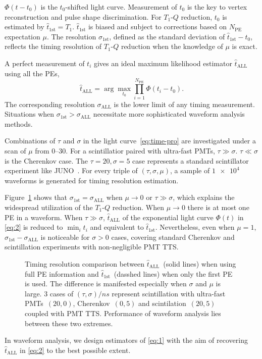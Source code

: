 $\Phi(t-t_0)$ is the $t_0$-shifted light curve. Measurement of $t_0$ is the key to vertex reconstruction and pulse shape discrimination.  For $T_1$-$Q$ reduction, $t_0$ is estimated by $\hat{t}_\mathrm{1st} = T_1$. $\hat{t}_\mathrm{1st}$ is biased and subject to corrections based on $N_\mathrm{PE}$ expectation $\mu$. The resolution $\sigma_\mathrm{1st}$, defined as the standard deviation of $\hat{t}_\mathrm{1st} - t_0$, reflects the timing resolution of $T_1$-$Q$ reduction when the knowledge of $\mu$ is exact.

A perfect measurement of $t_i$ gives an ideal maximum likelihood estimator $\hat{t}_\mathrm{ALL}$ using all the PEs,
\begin{equation}
  \label{eq:2}
  \hat{t}_\mathrm{ALL} = \arg\underset{t_0}{\max} \prod_{i=1}^{N_\mathrm{PE}} \Phi(t_i-t_0).
\end{equation}
The corresponding resolution $\sigma_\mathrm{ALL}$ is the lower limit of any timing measurement.  Situations when $\sigma_\mathrm{1st} > \sigma_\mathrm{ALL}$ necessitate more sophisticated waveform analysis methods.

Combinations of $\tau$ and $\sigma$ in the light curve~\eqref{eq:time-pro} are investigated under a scan of $\mu$ from \numrange{0}{30}. For a scintillatior paired with ultra-fast PMTs, $\tau \gg \sigma$.  $\tau \ll \sigma$ is the Cherenkov case.  The $\tau=20, \sigma=5$ case represents a standard scintillator experiment like JUNO~\cite{ludhova_particle_2020}.  For every triple of $(\tau, \sigma, \mu)$, a sample of $\num[retain-unity-mantissa=false]{1e4}$ waveforms is generated for timing resolution estimation.

Figure~\ref{fig:reso-diff} shows that $\sigma_{\mathrm{1st}}=\sigma_{\mathrm{ALL}}$ when $\mu \to 0$ or $\tau \gg \sigma$, which explains the widespread utilization of the $T_1$-$Q$ reduction.  When $\mu \to 0$ there is at most one PE in a waveform.  When $\tau \gg \sigma$, $\hat{t}_\mathrm{ALL}$ of the exponential light curve $\Phi(t)$ in \eqref{eq:2} is reduced to $\min_i t_i$ and equivalent to $\hat{t}_\mathrm{1st}$.  Nevertheless, even when $\mu = 1$, $\sigma_{\mathrm{1st}} - \sigma_{\mathrm{ALL}}$ is noticeable for $\sigma > 0$ cases, covering standard Cherenkov and scintillation experiments with non-negligible PMT TTS.
\begin{figure}[H]
  \centering
  \scalebox{0.63}{}
  \caption{\label{fig:reso-diff} Timing resolution comparison between $\hat{t}_{\mathrm{ALL}}$~(solid lines) when using full PE information and $\hat{t}_\mathrm{1st}$~(dasshed lines) when only the first PE is used.  The difference is manifested especially when $\sigma$ and $\mu$ is large.  3 cases of $(\tau, \sigma)/\si{ns}$ represent scintillation with ultra-fast PMTs~$(20,0)$, Cherenkov~$(0, 5)$ and scintilation~$(20, 5)$ coupled with PMT TTS. Performance of waveform analysis lies between these two extremes.}
\end{figure}

In waveform analysis, we design estimators of \eqref{eq:1} with the aim of recovering $\hat{t}_\mathrm{ALL}$ in \eqref{eq:2} to the best possible extent.
